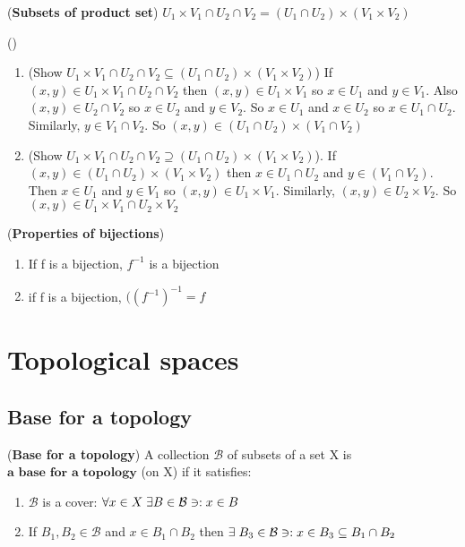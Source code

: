 \documentclass[11pt]{amsart}
\begin{document}
\begin{note}{(\textbf{Subsets of product set})}
$U_1 \times V_1 \cap U_2 \cap V_2 = (U_1 \cap U_2) \times (V_1 \times V_2)$
\begin{verify} () 
\begin{enumerate}
\item (Show $U_1 \times V_1 \cap U_2 \cap V_2 \subseteq (U_1 \cap U_2) \times (V_1 \times V_2)$)
If $(x,y) \in U_1 \times V_1 \cap U_2 \cap V_2 $ then $(x,y) \in U_1 \times V_1$ so $x \in U_1$ and $y \in V_1$.
Also $(x,y) \in  U_2 \cap V_2$ so $x \in U_2$ and $y \in V_2$. So $x \in U_1$ and $x \in U_2$ so $x \in U_1 \cap U_2$. Similarly, $y \in V_1 \cap V_2$. So $(x,y) \in (U_1 \cap U_2) \times (V_1 \cap V_2)$ 
\item (Show $U_1 \times V_1 \cap U_2 \cap V_2 \supseteq (U_1 \cap U_2) \times (V_1 \times V_2)$).
If $(x,y) \in (U_1 \cap U_2) \times (V_1 \times V_2)$ then $x \in U_1 \cap U_2$ and $y \in (V_1 \cap V_2)$. Then $x \in U_1$ and $y \in V_1$ so $(x,y) \in U_1 \times V_1$. Similarly,  $(x,y) \in U_2 \times V_2$. So $(x,y) \in U_1 \times V_1 \cap  U_2 \times V_2$
\end{enumerate}
\end{verify}
\end{note}

\begin{note}{(\textbf{Properties of bijections})}
\begin{enumerate}
\item If f is a bijection, $f^{-1}$ is a bijection
\item if f is a bijection, $((f^{-1})^{-1} = f$
\end{enumerate}
\end{note}

\section{Topological spaces}
\subsection{Base for a topology}

\begin{definition}{(\textbf{Base for a topology})} A collection $\mathcal{B}$ of subsets of a set X is $\textbf{a base for a topology}$ (on X) if it satisfies:
\begin{enumerate}[label=(\arabic*)]
\item $\mathcal{B}$ is a cover:  $\forall x \in X \;  \exists B \in \mathcal{B} \ni : x \in B$
\item If $B_1, B_2 \in \mathcal{B}$ and $x \in B_1 \cap B_2$ then $\exists \; B_3 \in \mathcal{B} \ni : x \in B_3 \subseteq B_1 \cap B_2$
\end{enumerate}
\end{definition}
\end{document}
